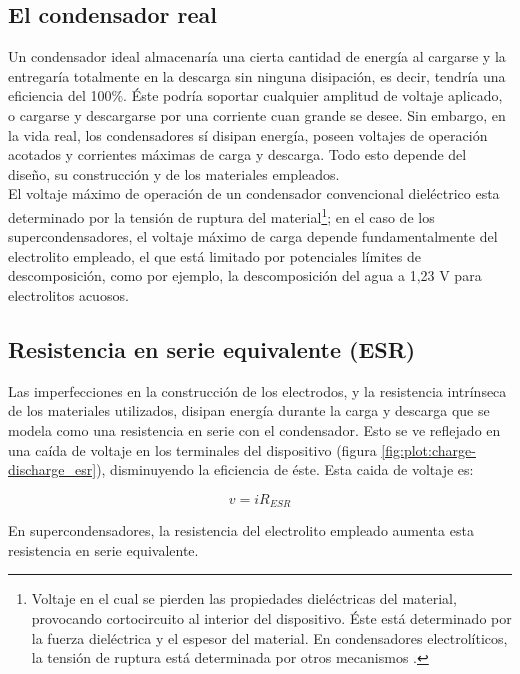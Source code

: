 \subsection{El condensador real}
Un condensador ideal almacenaría una cierta cantidad de energía al cargarse y la entregaría totalmente en la descarga sin ninguna disipación, es decir, tendría una eficiencia del 100\%. Éste podría soportar cualquier amplitud de voltaje aplicado, o cargarse y descargarse por una corriente cuan grande se desee.  Sin embargo, en la vida real, los condensadores sí disipan energía, poseen voltajes de operación acotados y corrientes máximas de carga y descarga. Todo esto depende del diseño, su construcción y de los materiales empleados.\\
El voltaje máximo de operación de un condensador convencional dieléctrico esta determinado por la tensión de ruptura del material\footnote{Voltaje en el cual se pierden las propiedades dieléctricas del material, provocando cortocircuito al interior del dispositivo. Éste está determinado por la fuerza dieléctrica y el espesor del material. En condensadores electrolíticos, la tensión de ruptura está determinada por otros mecanismos \citep{Yahalom1971}.}; en el caso de los supercondensadores, el voltaje máximo de carga depende fundamentalmente del electrolito empleado, el que está limitado por potenciales límites de descomposición, como por ejemplo, la descomposición del agua a 1,23 V para electrolitos acuosos.\\

\subsection{Resistencia en serie equivalente (ESR)}
Las imperfecciones en la construcción de los electrodos, y la resistencia intrínseca de los materiales utilizados, disipan energía durante la carga y descarga que se modela como una resistencia en serie con el condensador. Esto se ve reflejado en una caída de voltaje en los terminales del dispositivo (figura \ref{fig:plot:charge-discharge_esr}), disminuyendo la eficiencia de éste. Esta caida de voltaje es:

\begin{equation}
	v = iR_{ESR}
\end{equation}

En supercondensadores, la resistencia del electrolito empleado aumenta esta resistencia en serie equivalente.

